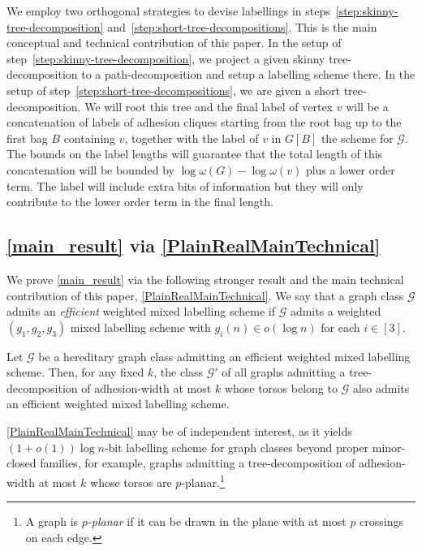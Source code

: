 \documentclass{patmorin}
\newcommand{\defin}[1]{\emph{\textcolor{brightmaroon}{#1}}}
\begin{document}
We employ two orthogonal strategies to devise labellings in steps~\ref{step:skinny-tree-decomposition} and~\ref{step:short-tree-decompositions}. 
This is the main conceptual and technical contribution of this paper. 
In the setup of step~\ref{step:skinny-tree-decomposition}, 
we project a given skinny tree-decomposition to a path-decomposition and setup a labelling scheme there. 
In the setup of step~\ref{step:short-tree-decompositions}, we are given a short tree-decomposition. 
We will root this tree and the final label of vertex $v$ will be a concatenation of labels of adhesion cliques starting from the root bag up to the first bag $B$ containing $v$, 
together with the label of $v$ in $G[B]$ the scheme for $\mathcal{G}$. 
The bounds on the label lengths will guarantee that the total length of this concatenation will be bounded by $\log\omega(G)-\log\omega(v)$ plus a lower order term. 
The label will include extra bits of information but they will only contribute to the lower order term in the final length.


\subsection{\cref{main_result} via \cref{PlainRealMainTechnical}}\label{ssec:maintech}


We prove \cref{main_result} via the following stronger result and the main technical contribution of this paper, \cref{PlainRealMainTechnical}.  We say that a graph class $\mathcal{G}$ admits an \defin{efficient} weighted mixed labelling scheme if $\mathcal{G}$ admits a weighted $(g_1,g_2,g_3)$ mixed labelling scheme with $g_i(n)\in o(\log n)$ for each $i\in [3]$. 


\begin{thm}\label{PlainRealMainTechnical}
    Let $\mathcal{G}$ be a hereditary graph class admitting an efficient weighted mixed labelling scheme. Then, for any fixed $k$, the class $\mathcal{G}'$ of all graphs admitting a tree-decomposition of adhesion-width at most $k$ whose torsos belong to $\mathcal{G}$ also admits an efficient weighted mixed labelling scheme.
\end{thm}

\cref{PlainRealMainTechnical} may be of independent interest, as it yields $(1+o(1))\log n$-bit labelling scheme for graph classes beyond proper minor-closed families, for example, graphs admitting a tree-decomposition of adhesion-width at most $k$ whose torsos are $p$-planar.\footnote{A graph is \defin{$p$-planar} if it can be drawn in the plane with at most $p$ crossings on each edge.}
\end{document}
